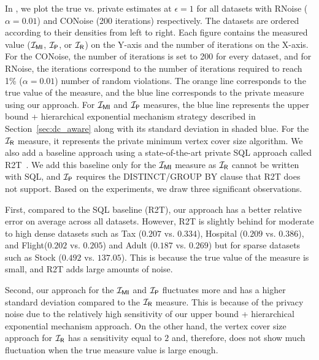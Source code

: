 In , we plot the true vs. private estimates at $\epsilon=1$ for all datasets with RNoise ($\alpha=0.01$) and CONoise (200 iterations) respectively. The datasets are ordered according to their densities from left to right. Each figure contains the measured value ($\mathcal{I_{\mathsf{MI}}}$, $\mathcal{I_\mathsf{P}}$, or $\mathcal{I_\mathsf{R}}$) on the Y-axis and the number of iterations on the X-axis. For the CONoise, the number of iterations is set to 200 for every dataset, and for RNoise, the iterations correspond to the number of iterations required to reach 1\% ($\alpha = 0.01$) number of random violations. The orange line corresponds to the true value of the measure, and the blue line corresponds to the private measure using our approach. For $\mathcal{I_{\mathsf{MI}}}$ and $\mathcal{I_\mathsf{P}}$ measures, the blue line represents the upper bound + hierarchical exponential mechanism strategy described in Section~\ref{sec:dc_aware} along with its standard deviation in shaded blue. For the $\mathcal{I_\mathsf{R}}$ measure, it represents the private minimum vertex cover size algorithm. We also add a baseline approach using a state-of-the-art private SQL approach called R2T~\cite{dong2022r2t}. We add this baseline only for the $\mathcal{I_{\mathsf{MI}}}$ measure as $\mathcal{I_\mathsf{R}}$ cannot be written with SQL, and $\mathcal{I_\mathsf{P}}$ requires the DISTINCT/GROUP BY clause that R2T does not support. Based on the experiments, we draw three significant observations. 

First, compared to the SQL baseline (R2T), our approach has a better relative error on average across all datasets. However, R2T is slightly behind for moderate to high dense datasets such as Tax ($0.207$ vs. $0.334$), Hospital ($0.209$ vs. $0.386$), and Flight($0.202$ vs. $0.205$) and Adult ($0.187$ vs. $0.269$) but  for sparse datasets such as Stock ($0.492$ vs. $137.05$). This is because the true value of the measure is small, and R2T adds large amounts of noise. 

Second, our approach for the $\mathcal{I_{\mathsf{MI}}}$ and $\mathcal{I_\mathsf{P}}$ fluctuates more and has a higher standard deviation compared to the $\mathcal{I_\mathsf{R}}$ measure. This is because of the privacy noise due to the relatively high sensitivity of our upper bound + hierarchical exponential mechanism approach.
On the other hand, the vertex cover size approach for $\mathcal{I_\mathsf{R}}$ has a sensitivity equal to $2$ and, therefore, does not show much fluctuation when the true measure value is large enough. 


